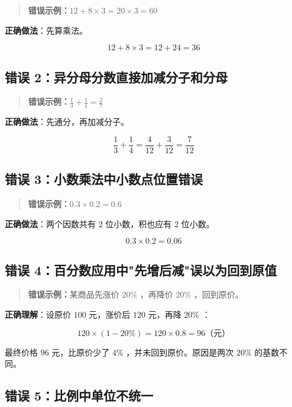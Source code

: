 \begin{quote}\textbf{错误示例：}$12 + 8 \times 3 = 20 \times 3 = 60$\end{quote}


\textbf{正确做法}：先算乘法。

\[
12 + 8 \times 3 = 12 + 24 = 36
\]


\subsection*{错误 2：异分母分数直接加减分子和分母}


\begin{quote}\textbf{错误示例：}$\frac{1}{3} + \frac{1}{4} = \frac{2}{7}$\end{quote}


\textbf{正确做法}：先通分，再加减分子。

\[
\frac{1}{3} + \frac{1}{4} = \frac{4}{12} + \frac{3}{12} = \frac{7}{12}
\]


\subsection*{错误 3：小数乘法中小数点位置错误}


\begin{quote}\textbf{错误示例：}$0.3 \times 0.2 = 0.6$\end{quote}


\textbf{正确做法}：两个因数共有 $2$ 位小数，积也应有 $2$ 位小数。

\[
0.3 \times 0.2 = 0.06
\]


\subsection*{错误 4：百分数应用中"先增后减"误以为回到原值}


\begin{quote}\textbf{错误示例：}某商品先涨价 $20\%$ ，再降价 $20\%$ ，回到原价。\end{quote}


\textbf{正确理解}：设原价 $100$ 元，涨价后 $120$ 元，再降 $20\%$ ：

\[
120 \times (1 - 20\%) = 120 \times 0.8 = 96 \text{（元）}
\]


最终价格 $96$ 元，比原价少了 $4\%$ ，并未回到原价。原因是两次 $20\%$ 的基数不同。

\subsection*{错误 5：比例中单位不统一}


